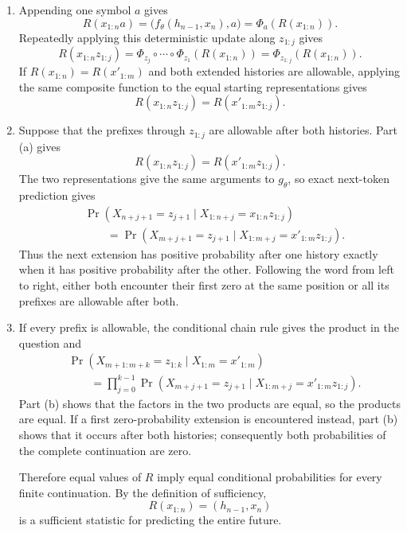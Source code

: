 \begin{solution}[ex:p2-4]
    \begin{enumerate}
      \item Appending one symbol $a$ gives
        \[
          R(x_{1:n}a)
            =\bigl(f_\theta(h_{n-1},x_n),a\bigr)
            =\Phi_a\!\left(R(x_{1:n})\right).
        \]
        Repeatedly applying this deterministic update along $z_{1:j}$ gives
        \[
          R(x_{1:n}z_{1:j})
            =\Phi_{z_j}\circ\cdots\circ\Phi_{z_1}
              \!\left(R(x_{1:n})\right)
            =\Phi_{z_{1:j}}\!\left(R(x_{1:n})\right).
        \]
        If $R(x_{1:n})=R(x'_{1:m})$ and both extended histories are
        allowable, applying the same composite function to the equal starting
        representations gives
        \[
          R(x_{1:n}z_{1:j})=R(x'_{1:m}z_{1:j}).
        \]

      \item Suppose that the prefixes through $z_{1:j}$ are allowable after
        both histories. Part (a) gives
        \[
          R(x_{1:n}z_{1:j})
            =R(x'_{1:m}z_{1:j}).
        \]
        The two representations give the same arguments to $g_\theta$, so
        exact next-token prediction gives
        \[
          \begin{aligned}
          &\Pr\!\left(
            X_{n+j+1}=z_{j+1}
            \mid X_{1:n+j}=x_{1:n}z_{1:j}
          \right)\\
          &\qquad=
          \Pr\!\left(
            X_{m+j+1}=z_{j+1}
            \mid X_{1:m+j}=x'_{1:m}z_{1:j}
          \right).
          \end{aligned}
        \]
        Thus the next extension has positive probability after one history
        exactly when it has positive probability after the other. Following
        the word from left to right, either both encounter their first zero at
        the same position or all its prefixes are allowable after both.

      \item If every prefix is allowable, the conditional chain rule gives
        the product in the question and
        \[
          \begin{aligned}
          &\Pr\!\left(
            X_{m+1:m+k}=z_{1:k}\mid X_{1:m}=x'_{1:m}
          \right)\\
          &\qquad=
          \prod_{j=0}^{k-1}
          \Pr\!\left(
            X_{m+j+1}=z_{j+1}
            \mid X_{1:m+j}=x'_{1:m}z_{1:j}
          \right).
          \end{aligned}
        \]
        Part (b) shows that the factors in the two products are equal, so the
        products are equal. If a first zero-probability extension is
        encountered instead, part (b) shows that it occurs after both
        histories; consequently both probabilities of the complete
        continuation are zero.

        Therefore equal values of $R$ imply equal conditional probabilities
        for every finite continuation. By the definition of sufficiency,
        \[
          R(x_{1:n})=(h_{n-1},x_n)
        \]
        is a sufficient statistic for predicting the entire future.
    \end{enumerate}
\end{solution}
